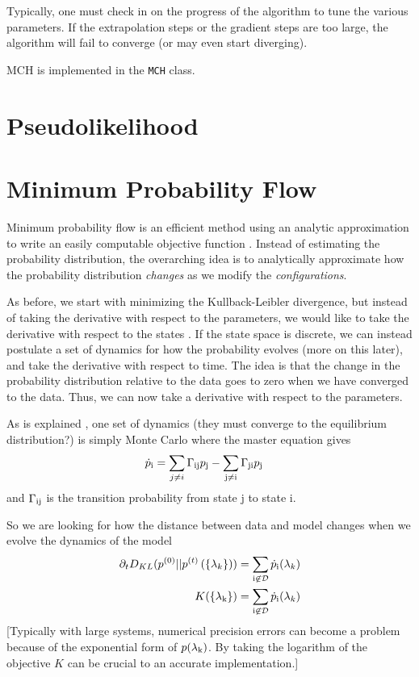 \documentclass[aps,prl,twocolumn]{revtex4-1}
\begin{document}
Typically, one must check in on the progress of the algorithm to tune the various parameters. If the extrapolation steps or the gradient steps are too large, the algorithm will fail to converge (or may even start diverging).

MCH is implemented in the {\tt MCH} class.

\section{Pseudolikelihood}

\section{Minimum Probability Flow}
Minimum probability flow is an efficient method using an analytic approximation to write an easily computable objective function \cite{SohlDickstein:2011im}. Instead of estimating the probability distribution, the overarching idea is to analytically approximate how the probability distribution \textit{changes} as we modify the \textit{configurations}.

As before, we start with minimizing the Kullback-Leibler divergence, but instead of taking the derivative with respect to the parameters, we would like to take the derivative with respect to the states \cite{Hyvärinen:2007ed}. If the state space is discrete, we can instead postulate a set of dynamics for how the probability evolves (more on this later), and take the derivative with respect to time. The idea is that  the change in the probability distribution relative to the data goes to zero when we have converged to the data. Thus, we can now take a derivative with respect to the parameters.

As is explained \cite{SohlDickstein:2011im}, one set of dynamics (they must converge to the equilibrium distribution?) is simply Monte Carlo where the master equation gives
\begin{align}
	\dot{p}_{\rm i} &= \sum_{j\neq i} \Gamma_{\rm ij} p_{\rm j} -\sum_{\rm j\neq i} \Gamma_{\rm ji} p_{\rm j}
\end{align}
and $\Gamma_{\rm ij}$ is the transition probability from state j to state i.

So we are looking for how the distance between data and model changes when we evolve the dynamics of the model
\begin{align}
	\partial_t D_{KL}(p^{(0)}||p^{(t)}\left(\{\lambda_k\}\right)) &= \sum_{\rm i \not\in \mathcal{D}} \dot{p}_{\rm i}(\lambda_k)\\
	K(\{\lambda_{\rm k}\}) &= \sum_{\rm i \not\in \mathcal{D}} \dot{p}_{\rm i}(\lambda_k)
\end{align}
[Typically with large systems, numerical precision errors can become a problem because of the exponential form of $p(\lambda_{\rm k})$. By taking the logarithm of the objective $K$ can be crucial to an accurate implementation.]
\end{document}
